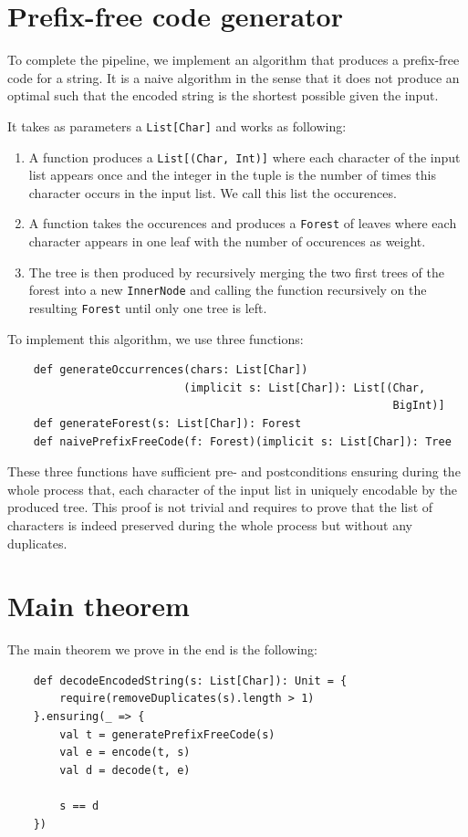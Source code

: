 \documentclass[a4paper,UKenglish,cleveref, autoref, thm-restate]{lipics-v2021}
\begin{document}
\section{Prefix-free code generator} 
To complete the pipeline, we implement an algorithm that produces a prefix-free code for a string. It is a naive algorithm in the sense that it does not produce an optimal such that the encoded string is the shortest possible given the input.

It takes as parameters a \lstinline{List[Char]} and works as following:
\begin{enumerate}
    \item A function produces a \lstinline{List[(Char, Int)]} where each character of the input list appears once and the integer in the tuple is the number of times this character occurs in the input list. We call this list the occurences.
    \item A function takes the occurences and produces a \lstinline{Forest} of leaves where each character appears in one leaf with the number of occurences as weight.
    \item The tree is then produced by recursively merging the two first trees of the forest into a new \lstinline{InnerNode} and calling the function recursively on the resulting \lstinline{Forest} until only one tree is left.
\end{enumerate}

To implement this algorithm, we use three functions:
\begin{lstlisting}
    def generateOccurrences(chars: List[Char])
                           (implicit s: List[Char]): List[(Char,
                                                           BigInt)]
    def generateForest(s: List[Char]): Forest
    def naivePrefixFreeCode(f: Forest)(implicit s: List[Char]): Tree
\end{lstlisting}

These three functions have sufficient pre- and postconditions ensuring during the whole process that,  each character of the input list in uniquely encodable by the produced tree.
This proof is not trivial and requires to prove that the list of characters is indeed preserved during the whole process but without any duplicates.

\section{Main theorem}
The main theorem we prove in the end is the following:
\begin{lstlisting}
    def decodeEncodedString(s: List[Char]): Unit = {
        require(removeDuplicates(s).length > 1)
    }.ensuring(_ => {
        val t = generatePrefixFreeCode(s)
        val e = encode(t, s)
        val d = decode(t, e)

        s == d
    })
\end{lstlisting}
\end{document}
